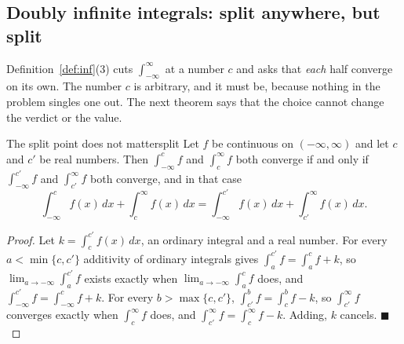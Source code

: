 \documentclass[11pt]{article}
\begin{document}
\subsection*{Doubly infinite integrals: split anywhere, but split}

Definition~\ref{def:inf}(3) cuts $\int_{-\infty}^\infty$ at a number $c$ and asks that \emph{each} half converge on its own. The number $c$ is arbitrary, and it must be, because nothing in the problem singles one out. The next theorem says that the choice cannot change the verdict or the value.

\begin{thm}{The split point does not matter}{split}
Let $f$ be continuous on $(-\infty,\infty)$ and let $c$ and $c'$ be real numbers. Then $\int_{-\infty}^cf$ and $\int_c^\infty f$ both converge if and only if $\int_{-\infty}^{c'}f$ and $\int_{c'}^\infty f$ both converge, and in that case
\[\int_{-\infty}^cf(x)\,dx+\int_c^\infty f(x)\,dx=\int_{-\infty}^{c'}f(x)\,dx+\int_{c'}^\infty f(x)\,dx .\]
\end{thm}
\begin{proof}
Let $k=\int_c^{c'}f(x)\,dx$, an ordinary integral and a real number. For every $a<\min\{c,c'\}$ additivity of ordinary integrals gives $\int_a^{c'}f=\int_a^cf+k$, so $\lim_{a\to-\infty}\int_a^{c'}f$ exists exactly when $\lim_{a\to-\infty}\int_a^cf$ does, and $\int_{-\infty}^{c'}f=\int_{-\infty}^cf+k$. For every $b>\max\{c,c'\}$, $\int_{c'}^bf=\int_c^bf-k$, so $\int_{c'}^\infty f$ converges exactly when $\int_c^\infty f$ does, and $\int_{c'}^\infty f=\int_c^\infty f-k$. Adding, $k$ cancels. $\blacksquare$
\end{proof}
\end{document}
